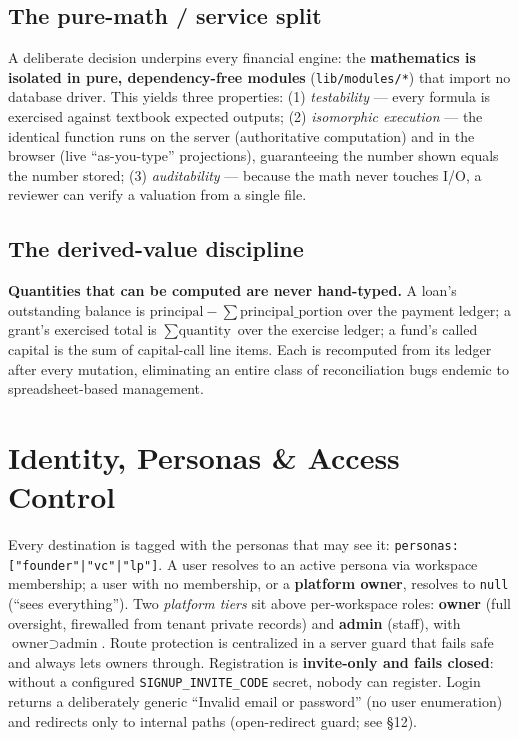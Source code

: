 \documentclass[11pt]{article}
\begin{document}
\subsection{The pure-math / service split}
A deliberate decision underpins every financial engine: the \textbf{mathematics is
isolated in pure, dependency-free modules} (\texttt{lib/modules/*}) that import no
database driver. This yields three properties: (1) \emph{testability} --- every
formula is exercised against textbook expected outputs; (2) \emph{isomorphic
execution} --- the identical function runs on the server (authoritative
computation) and in the browser (live ``as-you-type'' projections), guaranteeing
the number shown equals the number stored; (3) \emph{auditability} --- because the
math never touches I/O, a reviewer can verify a valuation from a single file.

\subsection{The derived-value discipline}
\textbf{Quantities that can be computed are never hand-typed.} A loan's outstanding
balance is $\text{principal}-\sum \text{principal\_portion}$ over the payment
ledger; a grant's exercised total is $\sum \text{quantity}$ over the exercise
ledger; a fund's called capital is the sum of capital-call line items. Each is
recomputed from its ledger after every mutation, eliminating an entire class of
reconciliation bugs endemic to spreadsheet-based management.

\section{Identity, Personas \& Access Control}
Every destination is tagged with the personas that may see it:
\texttt{personas: ["founder"|"vc"|"lp"]}. A user resolves to an active persona via
workspace membership; a user with no membership, or a \textbf{platform owner},
resolves to \texttt{null} (``sees everything''). Two \emph{platform tiers} sit
above per-workspace roles: \textbf{owner} (full oversight, firewalled from tenant
private records) and \textbf{admin} (staff), with $\text{owner}\supset\text{admin}$.
Route protection is centralized in a server guard that fails safe and always lets
owners through. Registration is \textbf{invite-only and fails closed}: without a
configured \texttt{SIGNUP\_INVITE\_CODE} secret, nobody can register. Login returns
a deliberately generic ``Invalid email or password'' (no user enumeration) and
redirects only to internal paths (open-redirect guard; see \S12).
\end{document}
